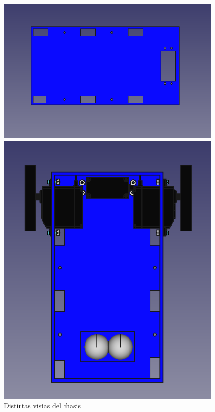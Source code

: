\begin{figure}[ht!]
	\centering
	\begin{minipage}{0.45\linewidth}
		\centering
		\includegraphics[width=\linewidth]{figs/cap5/basevistasuperiorsin.png}
		\caption*{\centering} %
	\end{minipage}
	\hspace{1cm}
	\begin{minipage}{0.45\linewidth}
		\centering
		\includegraphics[width=\linewidth]{figs/cap5/basecon2.png}
		\caption*{\centering}
	\end{minipage}
	\caption{Distintas vistas del chasis}
	\label{fig:pbase}
\end{figure}

